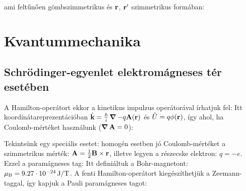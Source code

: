 \begin{description}
     ami feltűnően gömbszimmetrikus és $\mathbf{r}$, $\mathbf{r}'$ szimmetrikus formában:
   \end{description}
   
 \section{Kvantummechanika}
  
  \subsection{Schrödinger-egyenlet elektromágneses tér esetében}
   
   A Hamilton-operátort ekkor a kinetikus impulzus operátorával írhatjuk fel:
   Itt koordinátareprezentációban $\hat{\mathbf{k}}=\frac{\hbar}{i}\mathop{\boldsymbol{\nabla}}\nolimits-q\mathbf{A}(\mathbf{r})$ és $\hat{U}=q\phi(\mathbf{r})$, így 
   ahol, ha Coulomb-mértéket használunk ($\mathop{\boldsymbol{\nabla}}\nolimits{\mathbf{A}}=0$):
   
   Tekintsünk egy speciális esetet: homogén esetben jó Coulomb-mértéket a szimmetrikus mérték: $\mathbf{A}=\frac 12\mathbf{B}\times\mathbf{r}$, illetve legyen a részecske elektron: $q=-e$. Ezzel a paramágneses tag:
   Itt definiáltuk a Bohr-magnetont: $\mu_\text{B}=9.27\cdot 10^{-24}\mathrm{\, J/T}$. A fenti Hamilton-operátort kiegészíthetjük a Zeemann-taggal, így kapjuk a Pauli paramágneses tagot:
   
